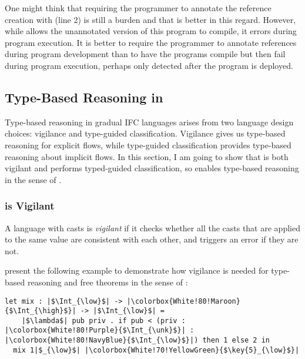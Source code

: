One might think that requiring the programmer to annotate the reference creation
with \high (line 2) is still a burden and that \GSLRef is better in this regard.
However, while \GSLRef allows the unannotated version of this program to
compile, it errors during program execution. It is better to require the
programmer to annotate references during program development than to have the
programs compile but then fail during program execution, perhaps only detected
after the program is deployed.

\subsection{Type-Based Reasoning in \Surface}
\label{sec:example3}

Type-based reasoning in gradual IFC languages arises from two language design
choices: vigilance and type-guided classification. Vigilance gives us type-based
reasoning for explicit flows, while type-guided classification provides
type-based reasoning about implicit flows. In this section, I am going to show
that \Surface is both vigilant and performs typed-guided classification, so
\Surface enables type-based reasoning in the sense of \textcite{Toro:2018aa}.

\subsubsection{\Surface is Vigilant}

A language with casts is \textit{vigilant} if it checks whether all the casts
that are applied to the same value are consistent with each other, and triggers
an error if they are not.

\textcite{Toro:2018aa} present the following example to demonstrate how vigilance
is needed for type-based reasoning and free theorems in the sense of
\textcite{Wadler:1989fk}:

\begin{lstlisting}[style=tt]
  let mix : |$\Int_{\low}$| -> |\colorbox{White!80!Maroon}{$\Int_{\high}$}| -> |$\Int_{\low}$| =
    |$\lambda$| pub priv . if pub < (priv : |\colorbox{White!80!Purple}{$\Int_{\unk}$}| : |\colorbox{White!80!NavyBlue}{$\Int_{\low}$}|) then 1 else 2 in
  mix 1|$_{\low}$| |\colorbox{White!70!YellowGreen}{$\key{5}_{\low}$}|
\end{lstlisting}

